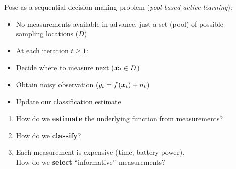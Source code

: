 \documentclass[10pt,mathserif]{beamer}
\begin{document}
\begin{frame}
Pose as a sequential decision making problem (\emph{pool-based active learning}):
\begin{itemize}
\item<2-> No measurements available in advance, just a set (pool) of possible\\sampling locations ($D$)
\vspace{0.5em}
\item<3->[]\hspace{-1.5em} At each iteration $t \geq 1$:
\item<3-> Decide where to measure next ($\bm{x}_t \in D$)
\item<4-> Obtain noisy observation ($y_t = f(\bm{x}_t) + n_t$)
\item<5-> Update our classification estimate
\end{itemize}
\end{frame}

\begin{frame}
\begin{enumerate}
\item<1-> How do we \textbf{estimate} the underlying function from measurements?
\vspace{1em}
\item<2-> How do we \textbf{classify}?
\vspace{1em}
\item<3-> Each measurement is expensive (time, battery power).\\
      How do we \textbf{select} ``informative'' measurements?
\end{enumerate}
\vspace{2em}
\begin{center}
\end{center}
\end{frame}
\end{document}
